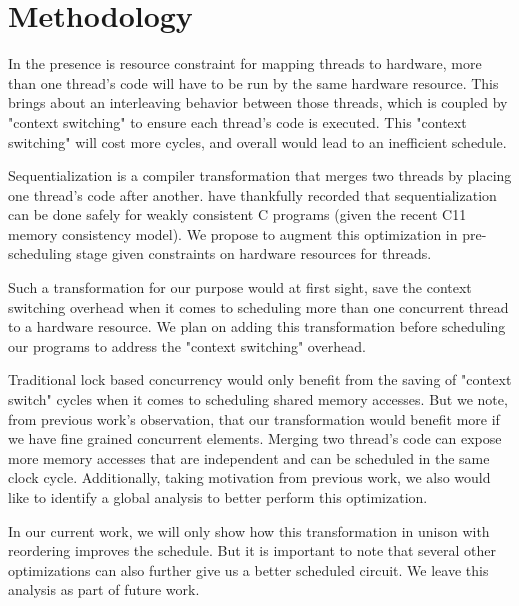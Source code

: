 \documentclass[sigplan,10pt,review]{acmart}
\begin{document}
    \section{Methodology}

        In the presence is resource constraint for mapping threads to hardware, more than one thread's code will have to be run by the same hardware resource.
        This brings about an interleaving behavior between those threads, which is coupled by "context switching" to ensure each thread's code is executed.
        This "context switching" will cost more cycles, and overall would lead to an inefficient schedule.

        Sequentialization is a compiler transformation that merges two threads by placing one thread's code after another. 
        \cite{DBLP:journals/pcs/MoiseenkoPK21} have thankfully recorded that sequentialization can be done safely for weakly consistent C programs (given the recent C11 memory consistency model).
        We propose to augment this optimization in pre-scheduling stage given constraints on hardware resources for threads.

        Such a transformation for our purpose would at first sight, save the context switching overhead when it comes to scheduling more than one concurrent thread to a hardware resource. 
        We plan on adding this transformation before scheduling our programs to address the "context switching" overhead. 

        Traditional lock based concurrency would only benefit from the saving of "context switch" cycles when it comes to scheduling shared memory accesses.
        But we note, from previous work's observation, that our transformation would benefit more if we have fine grained concurrent elements. 
        Merging two thread's code can expose more memory accesses that are independent and can be scheduled in the same clock cycle. 
        Additionally, taking motivation from previous work, we also would like to identify a global analysis to better perform this optimization. 
        
        In our current work, we will only show how this transformation in unison with reordering improves the schedule.
        But it is important to note that several other optimizations can also further give us a better scheduled circuit.
        We leave this analysis as part of future work.
\end{document}
